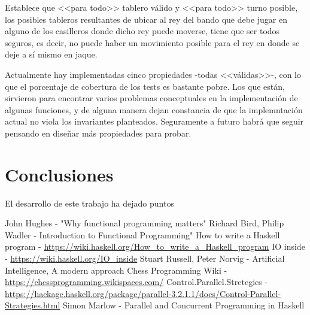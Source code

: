 \documentclass{llncs}
\begin{document}
Establece que <<para todo>> tablero válido y <<para todo>> turno posible, los posibles tableros resultantes de ubicar al rey del bando que debe jugar en alguno de los casilleros donde dicho rey puede moverse, tiene que ser todos seguros, es decir, no puede haber un movimiento posible para el rey en donde se deje a sí mismo en jaque.

Actualmente hay implementadas cinco propiedades -todas <<válidas>>-, con lo que el porcentaje de cobertura de los tests es bastante pobre. Los que están, sirvieron para encontrar varios problemas conceptuales en la implementación de algunas funciones, y de alguna manera dejan constancia de que la implemntación actual no viola los invariantes planteados. Seguramente a futuro habrá que seguir pensando en diseñar más propiedades para probar.

\section{Conclusiones}

El desarrollo de este trabajo ha dejado puntos





%
%
\begin{thebibliography}{}
  John Hughes - "Why functional programming matters"
  Richard Bird, Philip Wadler - Introduction to Functional Programming"
    How to write a Haskell program - \url{https://wiki.haskell.org/How\_to\_write\_a\_Haskell\_program}
    IO inside - \url{https://wiki.haskell.org/IO\_inside}
    Stuart Russell, Peter Norvig - Artificial Intelligence, A modern approach
    Chess Programming Wiki - \url{https://chessprogramming.wikispaces.com/}
    Control.Parallel.Stretegies - \url{https://hackage.haskell.org/package/parallel-3.2.1.1/docs/Control-Parallel-Strategies.html}
    Simon Marlow - Parallel and Concurrent Programming in Haskell
\end{thebibliography}
\end{document}
